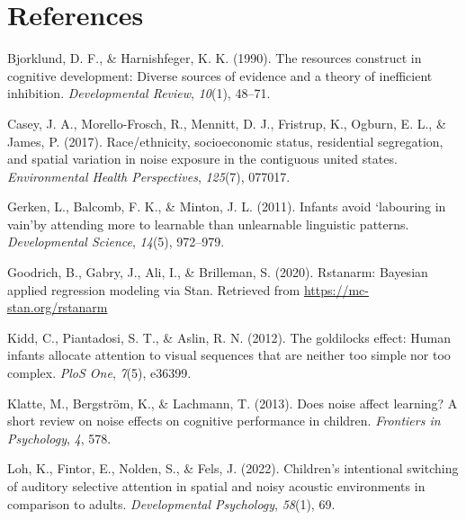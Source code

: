 \documentclass[10pt, letterpaper]{article}
\newenvironment{CSLReferences}%
  {}%
  {\par}
\begin{document}
\hypertarget{references}{%
\section{References}\label{references}}

\setlength{\parindent}{-0.1in} 
\setlength{\leftskip}{0.125in}

\noindent

\hypertarget{refs}{}
\begin{CSLReferences}{1}{0}
\leavevmode{}%
Bjorklund, D. F., \& Harnishfeger, K. K. (1990). The resources construct
in cognitive development: Diverse sources of evidence and a theory of
inefficient inhibition. \emph{Developmental Review}, \emph{10}(1),
48--71.

\leavevmode{}%
Casey, J. A., Morello-Frosch, R., Mennitt, D. J., Fristrup, K., Ogburn,
E. L., \& James, P. (2017). Race/ethnicity, socioeconomic status,
residential segregation, and spatial variation in noise exposure in the
contiguous united states. \emph{Environmental Health Perspectives},
\emph{125}(7), 077017.

\leavevmode{}%
Gerken, L., Balcomb, F. K., \& Minton, J. L. (2011). Infants avoid
`labouring in vain'by attending more to learnable than unlearnable
linguistic patterns. \emph{Developmental Science}, \emph{14}(5),
972--979.

\leavevmode{}%
Goodrich, B., Gabry, J., Ali, I., \& Brilleman, S. (2020). Rstanarm:
{Bayesian} applied regression modeling via {Stan}. Retrieved from
\url{https://mc-stan.org/rstanarm}

\leavevmode{}%
Kidd, C., Piantadosi, S. T., \& Aslin, R. N. (2012). The goldilocks
effect: Human infants allocate attention to visual sequences that are
neither too simple nor too complex. \emph{PloS One}, \emph{7}(5),
e36399.

\leavevmode{}%
Klatte, M., Bergström, K., \& Lachmann, T. (2013). Does noise affect
learning? A short review on noise effects on cognitive performance in
children. \emph{Frontiers in Psychology}, \emph{4}, 578.

\leavevmode{}%
Loh, K., Fintor, E., Nolden, S., \& Fels, J. (2022). Children's
intentional switching of auditory selective attention in spatial and
noisy acoustic environments in comparison to adults. \emph{Developmental
Psychology}, \emph{58}(1), 69.


\end{CSLReferences}
\end{document}
